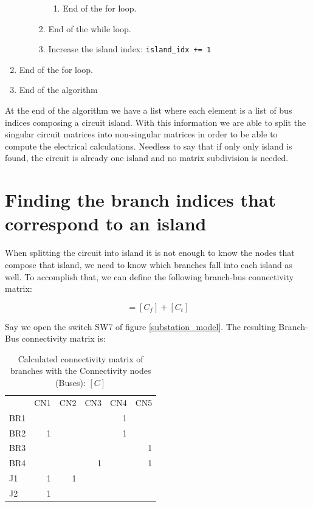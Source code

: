 \documentclass[nols,a4paper,twoside,symmetric,notoc,fleqn]{tufte-book}
\begin{document}
\begin{enumerate}
\begin{enumerate}
\begin{enumerate}
\begin{enumerate}
				\item End of the for loop.
				
			\end{enumerate}
			
			\item End of the while loop.
			
			\item Increase the island index: \verb|island_idx += 1|
			
		\end{enumerate}
		
	\end{enumerate}
	
	\item End of the for loop.
	
	\item End of the algorithm
\end{enumerate}

At the end of the algorithm we have a list where each element is a list of bus indices composing a circuit island. With this information we are able to split the singular circuit matrices into non-singular matrices in order to be able to compute the electrical calculations. Needless to say that if only only island is found, the circuit is already one island and no matrix subdivision is needed.

\section{Finding the branch indices that correspond to an island}

When splitting the circuit into island it is not enough to know the nodes that compose that island, we need to know which branches fall into each island as well. To accomplish that, we can define the following branch-bus connectivity matrix:

\begin{equation}
[C] = [C_f] + [C_t]
\end{equation}

Say we open the switch SW7 of figure \ref{substation_model}. The resulting Branch-Bus connectivity matrix is:

\begin{table}[h!]
 \begin{tabular}{lrrrrr}
	{} &  CN1 &  CN2 &  CN3 &  CN4 &  CN5 \\
	BR1 &      &      &      &    1 &      \\
	BR2 &    1 &      &      &    1 &      \\
	BR3 &      &      &      &      &    1 \\
	BR4 &      &      &    1 &      &    1 \\
	J1  &    1 &    1 &      &      &      \\
	J2  &    1 &      &      &      &      \\
\end{tabular}
	\caption{Calculated connectivity matrix of branches with the Connectivity nodes (Buses): $[C]$}
\end{table}
\end{document}
